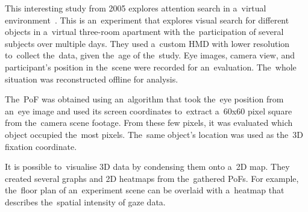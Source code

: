 This interesting study from 2005 explores attention search in a~virtual environment~\cite{kit2014}. This is an~experiment that explores visual search for different objects in a~virtual three-room apartment with the~participation of several subjects over multiple days.
They used a~custom HMD with lower resolution to~collect the~data, given the~age of the~study. Eye images, camera view, and participant's position in the~scene were recorded for an~evaluation. The~whole situation was reconstructed offline for analysis.

The~PoF was obtained using an~algorithm that took the~eye position from an~eye image and used its screen coordinates to~extract a~60x60 pixel square from the~camera scene footage. From these few pixels, it was evaluated which object occupied the~most pixels. The~same object's location was used as the~3D fixation coordinate.

It is possible to~visualise 3D data by condensing them onto a~2D map. They created several graphs and 2D heatmaps from the~gathered PoFs. For example, the~floor plan of an~experiment scene can be overlaid with a~heatmap that describes the~spatial intensity of gaze data.

